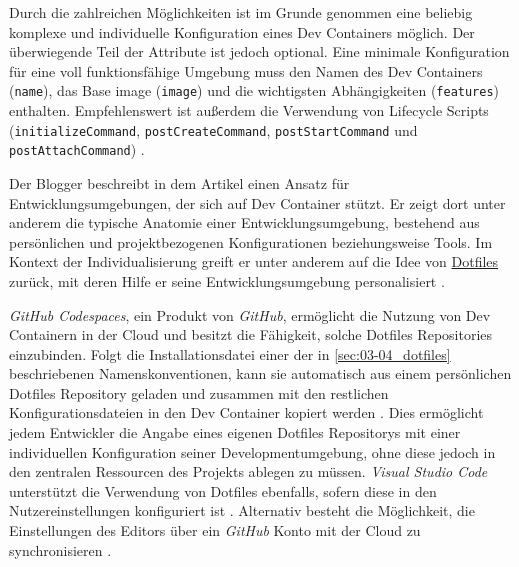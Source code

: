 Durch die zahlreichen Möglichkeiten ist im Grunde genommen eine beliebig komplexe und individuelle Konfiguration eines Dev Containers möglich. Der überwiegende Teil der Attribute ist jedoch optional. Eine minimale Konfiguration für eine voll funktionsfähige Umgebung muss den Namen des Dev Containers (\texttt{name}), das Base \Gls{image} (\texttt{image}) und die wichtigsten Abhängigkeiten (\texttt{features}) enthalten. Empfehlenswert ist außerdem die Verwendung von Lifecycle Scripts (\texttt{initializeCommand}, \texttt{postCreateCommand}, \texttt{postStartCommand} und \texttt{postAttachCommand}) \cite{204:Development-Containers-Simplified}.

Der Blogger \citeauthor{203:Dev-Environment-as-a-Code-with-DevContainers-Dotfiles-and-GitHub-Codespaces} beschreibt in dem Artikel  einen Ansatz für Entwicklungsumgebungen, der sich auf Dev Container stützt. Er zeigt dort unter anderem die typische Anatomie einer Entwicklungsumgebung, bestehend aus persönlichen und projektbezogenen Konfigurationen beziehungsweise Tools. Im Kontext der Individualisierung greift er unter anderem auf die Idee von \hyperref[sec:03-04_dotfiles]{Dotfiles} zurück, mit deren Hilfe er seine Entwicklungsumgebung personalisiert \cite{203:Dev-Environment-as-a-Code-with-DevContainers-Dotfiles-and-GitHub-Codespaces}.

\textit{GitHub Codespaces}, ein Produkt von \textit{GitHub}, ermöglicht die Nutzung von Dev Containern in der Cloud und besitzt die Fähigkeit, solche Dotfiles Repositories einzubinden. Folgt die Installationsdatei einer der in \autoref{sec:03-04_dotfiles} beschriebenen Namenskonventionen, kann sie automatisch aus einem persönlichen Dotfiles Repository geladen und zusammen mit den restlichen Konfigurationsdateien in den Dev Container kopiert werden \cite{304:Personalizing-GitHub-Codespaces-for-your-Account}. Dies ermöglicht jedem Entwickler die Angabe eines eigenen Dotfiles Repositorys mit einer individuellen Konfiguration seiner Developmentumgebung, ohne diese jedoch in den zentralen Ressourcen des Projekts ablegen zu müssen. \textit{Visual Studio Code} unterstützt die Verwendung von Dotfiles ebenfalls, sofern diese in den Nutzereinstellungen konfiguriert ist \cite{201:How-to-develop-with-Dev-Containers}. Alternativ besteht die Möglichkeit, die Einstellungen des Editors über ein \textit{GitHub} Konto mit der Cloud zu synchronisieren \cite{304:Personalizing-GitHub-Codespaces-for-your-Account}.

